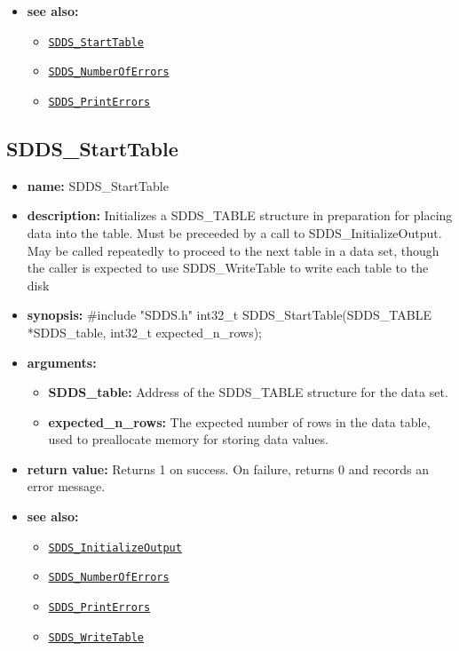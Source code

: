 \documentclass[11pt]{article}
\newcommand{\progref}[1]{\hyperref[SDDS_#1]{\tt SDDS\_#1}}
\begin{document}
\begin{itemize}
\item {\bf see also:}
\begin{itemize}
\item \progref{StartTable}
\item \progref{NumberOfErrors}
\item \progref{PrintErrors}
\end{itemize}
\end{itemize}

\subsection{SDDS\_StartTable}
\label{SDDS_StartTable}

\begin{itemize}
\item {\bf name:}\newline
SDDS\_StartTable
\item {\bf description:}\newline
Initializes a SDDS\_TABLE structure in preparation for placing data into the table. Must be preceeded by a call to SDDS\_InitializeOutput. May be called repeatedly to proceed to the next table in a data set, though the caller is expected to use SDDS\_WriteTable to write each table to the disk
\item {\bf synopsis:} \#include "SDDS.h"\newline
int32\_t SDDS\_StartTable(SDDS\_TABLE *SDDS\_table, int32\_t expected\_n\_rows);
\item {\bf arguments:}
\begin{itemize}
\item {\bf SDDS\_table:} Address of the SDDS\_TABLE structure for the data set.
\item {\bf expected\_n\_rows:} The expected number of rows in the data table, used to preallocate memory for storing data values.
\end{itemize}
\item {\bf return value:}\newline
Returns 1 on success. On failure, returns 0 and records an error message.
\item {\bf see also:}
\begin{itemize}
\item \progref{InitializeOutput}
\item \progref{NumberOfErrors}
\item \progref{PrintErrors}
\item \progref{WriteTable}
\end{itemize}
\end{itemize}
\end{document}
